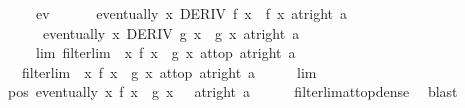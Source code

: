 \begin{isabellebody}
\ \ \ \ \ ev{\isacharcolon}{\kern0pt}\isanewline
\ \ \ \ \ \ {\isachardoublequoteopen}eventually\ {\isacharparenleft}{\kern0pt}{\isasymlambda}x{\isachardot}{\kern0pt}\ DERIV\ f\ x\ {\isacharcolon}{\kern0pt}{\isachargreater}{\kern0pt}\ f{\isacharprime}{\kern0pt}\ x{\isacharparenright}{\kern0pt}\ {\isacharparenleft}{\kern0pt}at{\isacharunderscore}{\kern0pt}right\ a{\isacharparenright}{\kern0pt}{\isachardoublequoteclose}\isanewline
\ \ \ \ \ \ {\isachardoublequoteopen}eventually\ {\isacharparenleft}{\kern0pt}{\isasymlambda}x{\isachardot}{\kern0pt}\ DERIV\ g\ x\ {\isacharcolon}{\kern0pt}{\isachargreater}{\kern0pt}\ g{\isacharprime}{\kern0pt}\ x{\isacharparenright}{\kern0pt}\ {\isacharparenleft}{\kern0pt}at{\isacharunderscore}{\kern0pt}right\ a{\isacharparenright}{\kern0pt}{\isachardoublequoteclose}\isanewline
\ \ \ \ \ lim{\isacharcolon}{\kern0pt}\ {\isachardoublequoteopen}filterlim\ {\isacharparenleft}{\kern0pt}{\isasymlambda}\ x{\isachardot}{\kern0pt}\ {\isacharparenleft}{\kern0pt}f{\isacharprime}{\kern0pt}\ x\ {\isacharslash}{\kern0pt}\ g{\isacharprime}{\kern0pt}\ x{\isacharparenright}{\kern0pt}{\isacharparenright}{\kern0pt}\ at{\isacharunderscore}{\kern0pt}top\ {\isacharparenleft}{\kern0pt}at{\isacharunderscore}{\kern0pt}right\ a{\isacharparenright}{\kern0pt}{\isachardoublequoteclose}\isanewline
\ \ \ {\isachardoublequoteopen}filterlim\ {\isacharparenleft}{\kern0pt}{\isasymlambda}\ x{\isachardot}{\kern0pt}\ f\ x\ {\isacharslash}{\kern0pt}\ g\ x{\isacharparenright}{\kern0pt}\ at{\isacharunderscore}{\kern0pt}top\ {\isacharparenleft}{\kern0pt}at{\isacharunderscore}{\kern0pt}right\ a{\isacharparenright}{\kern0pt}{\isachardoublequoteclose}\isanewline
%
\isadelimproof
%
\endisadelimproof
%
\isatagproof
{}\isamarkupfalse%
\ {\isacharminus}{\kern0pt}\isanewline
\ \ \isamarkupfalse%
\ lim\ \isamarkupfalse%
\ pos{\isacharcolon}{\kern0pt}\ {\isachardoublequoteopen}eventually\ {\isacharparenleft}{\kern0pt}{\isasymlambda}x{\isachardot}{\kern0pt}\ f{\isacharprime}{\kern0pt}\ x\ {\isacharslash}{\kern0pt}\ g{\isacharprime}{\kern0pt}\ x\ {\isachargreater}{\kern0pt}\ {}{\isacharparenright}{\kern0pt}\ {\isacharparenleft}{\kern0pt}at{\isacharunderscore}{\kern0pt}right\ a{\isacharparenright}{\kern0pt}{\isachardoublequoteclose}\isanewline
\ \ \ \ \isamarkupfalse%
\ filterlim{\isacharunderscore}{\kern0pt}at{\isacharunderscore}{\kern0pt}top{\isacharunderscore}{\kern0pt}dense\ \isamarkupfalse%
\ blast\isanewline
\ \ \isamarkupfalse%

\end{isabellebody}
